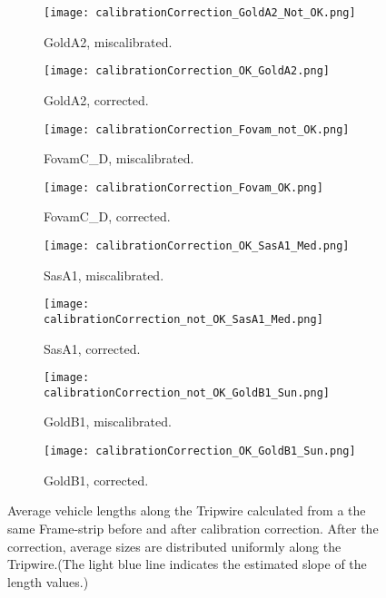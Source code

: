 \clearpage
\addtolength{\topmargin}{-.6in}
\begin{figure}[p]
	\thispagestyle{empty}
	\centering
	\begin{subfigure}[t]{0.36\textwidth}
		\texttt{[image: calibrationCorrection\_GoldA2\_Not\_OK.png]}
		\caption{GoldA2, miscalibrated.}
	\end{subfigure}
	\quad
	\begin{subfigure}[t]{0.36\textwidth}
		\texttt{[image: calibrationCorrection\_OK\_GoldA2.png]}
		\caption{GoldA2, corrected.}
	\end{subfigure}
	\hfill
	\begin{subfigure}[t]{0.36\textwidth}
		\texttt{[image: calibrationCorrection\_Fovam\_not\_OK.png]}
		\caption{FovamC\_D, miscalibrated.}
	\end{subfigure}
	\quad
	\begin{subfigure}[t]{0.36\textwidth}
		\texttt{[image: calibrationCorrection\_Fovam\_OK.png]}
		\caption{FovamC\_D, corrected.}
	\end{subfigure}
\hfill
\begin{subfigure}[t]{0.36\textwidth}
	\texttt{[image: calibrationCorrection\_OK\_SasA1\_Med.png]}
	\caption{SasA1, miscalibrated.}
\end{subfigure}
\quad
\begin{subfigure}[t]{0.36\textwidth}
	\texttt{[image: calibrationCorrection\_not\_OK\_SasA1\_Med.png]}
	\caption{SasA1, corrected.}
\end{subfigure}
\hfill
\begin{subfigure}[t]{0.36\textwidth}
	\texttt{[image: calibrationCorrection\_not\_OK\_GoldB1\_Sun.png]}
	\caption{GoldB1, miscalibrated.}
\end{subfigure}
\quad
\begin{subfigure}[t]{0.36\textwidth}
	\texttt{[image: calibrationCorrection\_OK\_GoldB1\_Sun.png]}
	\caption{GoldB1, corrected.}
\end{subfigure}
	\caption{Average vehicle lengths along the Tripwire calculated from a the same Frame-strip before and after calibration correction. After the correction, average sizes are distributed uniformly along the Tripwire.(The light blue line indicates the estimated slope of the length values.)\label{fig:calibrations2}}
\end{figure}

\clearpage
\addtolength{\topmargin}{+.6in}
